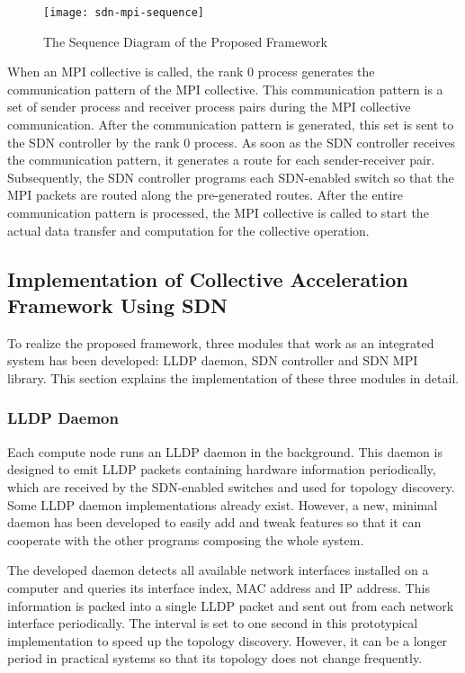 \begin{figure}
    \centering
    \texttt{[image: sdn-mpi-sequence]}
    \caption{The Sequence Diagram of the Proposed Framework}%
    \label{fig:proposal-sequence}
\end{figure}

When an MPI collective is called, the rank 0 process generates the
communication pattern of the MPI collective. This communication pattern is a
set of sender process and receiver process pairs during the MPI collective
communication. After the communication pattern is generated, this set is sent
to the SDN controller by the rank 0 process. As soon as the SDN controller
receives the communication pattern, it generates a route for each
sender-receiver pair. Subsequently, the SDN controller programs each
SDN-enabled switch so that the MPI packets are routed along the pre-generated
routes. After the entire communication pattern is processed, the MPI
collective is called to start the actual data transfer and computation for the
collective operation.

\subsection{Implementation of Collective Acceleration Framework Using SDN}

To realize the proposed framework, three modules that work as an integrated
system has been developed: LLDP daemon, SDN controller and SDN MPI library.
This section explains the implementation of these three modules in detail.

\subsubsection{LLDP Daemon}

Each compute node runs an LLDP daemon in the background. This daemon is
designed to emit LLDP packets containing hardware information periodically,
which are received by the SDN-enabled switches and used for topology
discovery. Some LLDP daemon implementations already exist. However, a new,
minimal daemon has been developed to easily add and tweak features so that it
can cooperate with the other programs composing the whole system.

The developed daemon detects all available network interfaces installed on a
computer and queries its interface index, MAC address and IP address.
This information is packed into a single LLDP packet and sent out from
each network interface periodically. The interval is set to one second in
this prototypical implementation to speed up the topology discovery.
However, it can be a longer period in practical systems so that its
topology does not change frequently.

